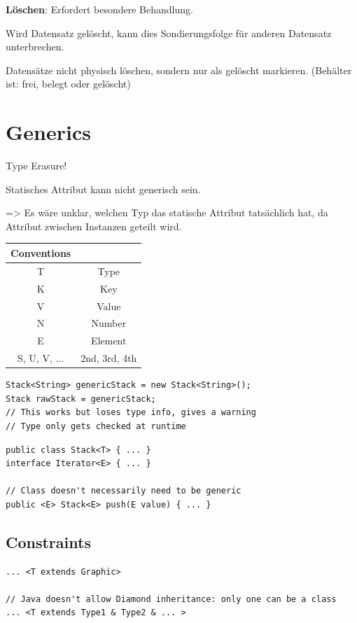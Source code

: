 \begin{multicols*}{4}
		\textbf{Löschen}: Erfordert besondere Behandlung.
		
		Wird Datensatz gelöscht, kann dies Sondierungsfolge für anderen Datensatz unterbrechen.
		
		Datensätze nicht physisch löschen, sondern nur als gelöscht markieren. (Behälter ist: frei, belegt oder gelöscht)

\section{Generics}
Type Erasure!

Statisches Attribut kann nicht generisch sein.

=> Es wäre unklar, welchen Typ das statische Attribut tatsächlich hat, da Attribut zwischen Instanzen geteilt wird.

	\begin{tabular}{c | c}
		\textbf{Conventions} &  \\
		\hline
		T & Type \\
		K & Key \\
		V & Value \\
		N & Number \\
		E & Element \\
		S, U, V, ... & 2nd, 3rd, 4th \\
	\end{tabular}

	\begin{lstlisting}
Stack<String> genericStack = new Stack<String>();
Stack rawStack = genericStack;
// This works but loses type info, gives a warning
// Type only gets checked at runtime
	\end{lstlisting}

\vspace{5pt}

	\begin{lstlisting}
public class Stack<T> { ... }
interface Iterator<E> { ... }

// Class doesn't necessarily need to be generic
public <E> Stack<E> push(E value) { ... }
	\end{lstlisting}

	\subsection{Constraints}
		\begin{lstlisting}
... <T extends Graphic>

// Java doesn't allow Diamond inheritance: only one can be a class
... <T extends Type1 & Type2 & ... >


\end{lstlisting}
\end{multicols*}
